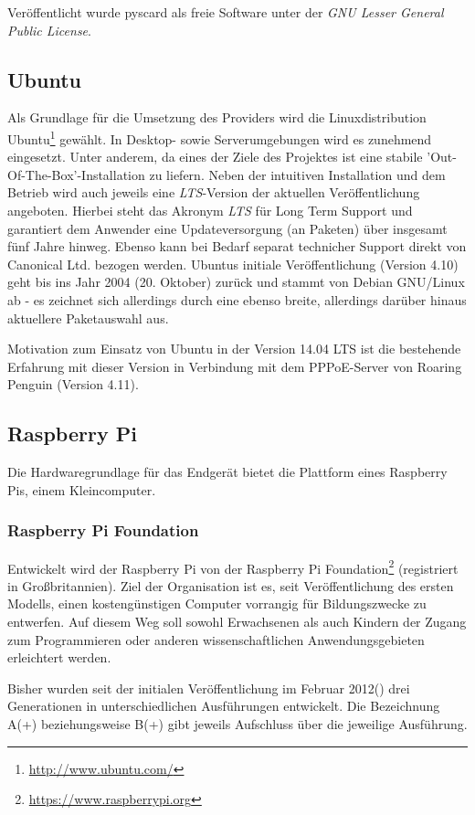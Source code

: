 Veröffentlicht wurde pyscard als freie Software unter der
\textit{GNU Lesser General Public License}.

\subsection{Ubuntu}
\label{subsec:ubuntu}
Als Grundlage für die Umsetzung des Providers wird die Linuxdistribution Ubuntu\footnote{\url{http://www.ubuntu.com/}}
gewählt. In Desktop- sowie Serverumgebungen wird es zunehmend eingesetzt.
Unter anderem, da eines der Ziele des Projektes ist eine stabile
'Out-Of-The-Box'-Installation zu liefern. Neben der intuitiven Installation und dem
Betrieb wird auch jeweils eine \textit{LTS}-Version der aktuellen Veröffentlichung angeboten.
Hierbei steht das Akronym \textit{LTS} für Long Term Support und garantiert dem Anwender eine
Updateversorgung (an Paketen) über insgesamt fünf Jahre hinweg. Ebenso kann bei
Bedarf separat technicher Support direkt von Canonical
Ltd. bezogen werden. Ubuntus initiale Veröffentlichung (Version 4.10) geht bis ins Jahr
2004 (20. Oktober) zurück und stammt von Debian GNU/Linux ab - es zeichnet sich
allerdings durch eine ebenso breite, allerdings darüber hinaus aktuellere Paketauswahl aus.

Motivation zum Einsatz von Ubuntu in der Version 14.04 LTS ist die bestehende Erfahrung
mit dieser Version in Verbindung mit dem PPPoE-Server von Roaring Penguin (Version 4.11). 

\subsection{Raspberry Pi}

Die Hardwaregrundlage für das Endgerät bietet die Plattform eines Raspberry Pis, einem Kleincomputer.

\subsubsection{Raspberry Pi Foundation}
Entwickelt wird der Raspberry Pi von der Raspberry Pi Foundation\footnote{\url{https://www.raspberrypi.org}}
(registriert in Großbritannien). Ziel der Organisation ist es,
seit Veröffentlichung des ersten Modells, einen kostengünstigen
Computer vorrangig für Bildungszwecke zu entwerfen. Auf diesem
Weg soll sowohl Erwachsenen als auch Kindern der Zugang zum
Programmieren oder anderen wissenschaftlichen Anwendungsgebieten
erleichtert werden.

Bisher wurden seit der initialen Veröffentlichung im Februar 2012(\cite{rasppifoundweb})
drei Generationen in unterschiedlichen Ausführungen
entwickelt. Die Bezeichnung A(+) beziehungsweise B(+) gibt jeweils Aufschluss
über die jeweilige Ausführung.


